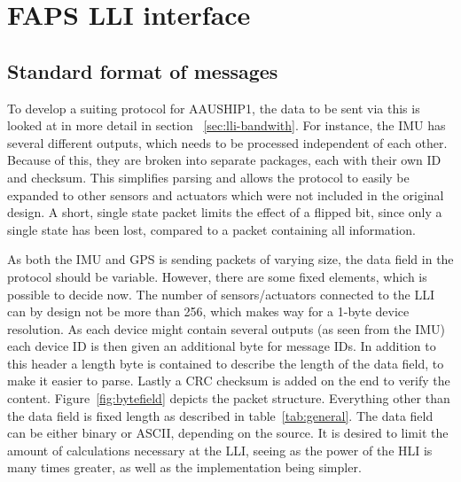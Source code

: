 \chapter{FAPS LLI interface}
\section{Standard format of messages}

To develop a suiting protocol for AAUSHIP1, the data to be sent via this is looked at in more detail in section ~\vref{sec:lli-bandwith}. For instance, the \ac{IMU} has several different outputs, which needs to be processed independent of each other. Because of this, they are broken into separate packages, each with their own ID and checksum. This simplifies parsing and allows the protocol to easily be expanded to other sensors and actuators which were not included in the original design. A short, single state packet limits the effect of a flipped bit, since only a single state has been lost, compared to a packet containing all information.

As both the \ac{IMU} and \ac{GPS} is sending packets of varying size, the data field in the protocol should be variable. However, there are some fixed elements, which is possible to decide now. The number of sensors/actuators connected to the \ac{LLI} can by design not be more than 256, which makes way for a 1-byte device resolution. As each device might contain several outputs (as seen from the \ac{IMU}) each device ID is then given an additional byte for message IDs. In addition to this header a length byte is contained to describe the length of the data field, to make it easier to parse. Lastly a \ac{CRC} checksum is added on the end to verify the content. Figure~\vref{fig:bytefield} depicts the packet structure. Everything other than the data field is fixed length as described in table~\vref{tab:general}. 
The data field can be either binary or ASCII, depending on the source. It is desired to limit the amount of calculations necessary at the LLI, seeing as the power of the HLI is many times greater, as well as the implementation being simpler.

